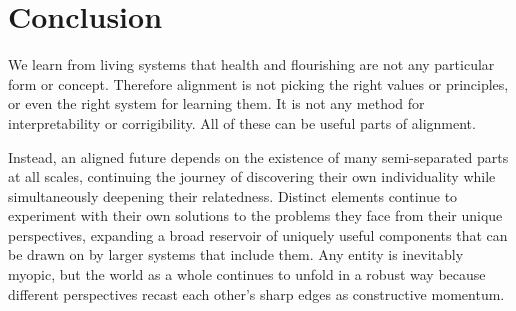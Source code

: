 \documentclass[11pt]{article}
\begin{document}









\section*{Conclusion}


We learn from living systems that health and flourishing are not any particular form or concept. Therefore alignment is not picking the right values or principles, or even the right system for learning them. It is not any method for interpretability or corrigibility. All of these can be useful parts of alignment.

Instead, an aligned future depends on the existence of many semi-separated parts at all scales, continuing the journey of discovering their own individuality while simultaneously deepening their relatedness. Distinct elements continue to experiment with their own solutions to the problems they face from their unique perspectives, expanding a broad reservoir of uniquely useful components that can be drawn on by larger systems that include them. Any entity is inevitably myopic, but the world as a whole continues to unfold in a robust way because different perspectives recast each other's sharp edges as constructive momentum.
\end{document}
